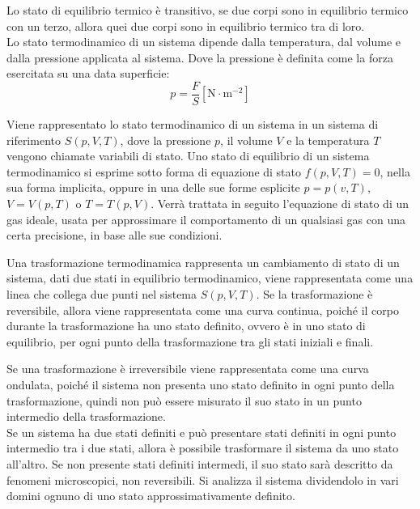 \documentclass{article}
\numberwithin{equation}{subsection}
\begin{document}
Lo stato di equilibrio 
termico è transitivo, se due corpi sono in equilibrio termico 
con un terzo, allora quei due corpi sono in equilibrio termico 
tra di loro. 
\\
Lo stato termodinamico di un sistema dipende dalla temperatura, 
dal volume e dalla pressione applicata al sistema. Dove la pressione 
è definita come la forza esercitata su una data superficie:
\begin{equation*}
    p=\displaystyle\frac{F}{S}\left[\mathrm{N}\cdot\mathrm{m}^{-2}\right]
\end{equation*}


Viene rappresentato lo stato termodinamico di un sistema in un sistema di 
riferimento $S(p,V,T)$, dove la pressione $p$, il volume $V$ e la temperatura $T$ vengono chiamate variabili di stato. 
Uno stato di equilibrio di un sistema termodinamico si esprime sotto forma di equazione di stato $f(p,V,T)=0$, nella sua forma implicita, oppure in una delle sue forme 
esplicite $p=p(v,T)$, $V=V(p,T)$ o $T=T(p,V)$. Verrà trattata in seguito l'equazione di stato di un gas ideale, usata per approssimare il comportamento di un qualsiasi 
gas con una certa precisione, in base alle sue condizioni. 



Una trasformazione termodinamica rappresenta un cambiamento di stato di un sistema, dati due stati in equilibrio termodinamico, viene 
rappresentata come una linea che collega due punti nel sistema $S(p,V,T)$. Se la trasformazione è reversibile, 
allora viene rappresentata come una curva continua, poiché 
il corpo durante la trasformazione ha uno stato definito, ovvero 
è in uno stato di equilibrio, per ogni punto della trasformazione tra gli stati iniziali e finali. 



Se una trasformazione 
è irreversibile viene rappresentata come una curva ondulata, 
poiché il sistema non presenta uno stato definito in ogni 
punto della trasformazione, quindi non può essere misurato il suo 
stato in un punto intermedio della trasformazione. 
\\
Se un sistema ha due stati definiti e può presentare stati 
definiti in ogni punto intermedio tra i due stati, allora è 
possibile trasformare il sistema da uno stato all'altro. Se non 
presente stati definiti intermedi, il suo stato sarà descritto da 
fenomeni microscopici, non reversibili. Si analizza il sistema dividendolo in vari domini ognuno di uno stato approssimativamente definito.  
\end{document}
